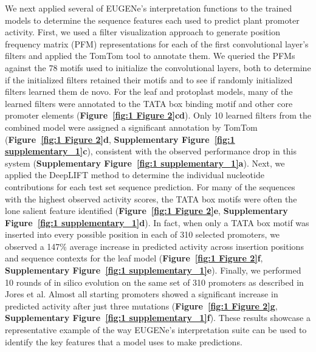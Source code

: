 We next applied several of EUGENe’s interpretation functions to the trained models to determine the sequence features each used to predict plant promoter activity. First, we used a filter visualization approach\cite{Minnoye2020-vz} to generate position frequency matrix (PFM) representations for each of the first convolutional layer’s filters and applied the TomTom\cite{Gupta2007-zw} tool to annotate them. We queried the PFMs against the 78 motifs used to initialize the convolutional layers, both to determine if the initialized filters retained their motifs and to see if randomly initialized filters learned them de novo. For the leaf and protoplast models, many of the learned filters were annotated to the TATA box binding motif and other core promoter elements (\textbf{Figure~\ref{fig:1 Figure 2}c}\textbf{d}). Only 10 learned filters from the combined model were assigned a significant annotation by TomTom (\textbf{Figure~\ref{fig:1 Figure 2}d}, \textbf{Supplementary Figure~\ref{fig:1 supplementary_1}c}), consistent with the observed performance drop in this system (\textbf{Supplementary Figure~\ref{fig:1 supplementary_1}a}). Next, we applied the DeepLIFT method\cite{Shrikumar2016-lf} to determine the individual nucleotide contributions for each test set sequence prediction. For many of the sequences with the highest observed activity scores, the TATA box motifs were often the lone salient feature identified (\textbf{Figure~\ref{fig:1 Figure 2}e}, \textbf{Supplementary Figure~\ref{fig:1 supplementary_1}d}). In fact, when only a TATA box motif was inserted into every possible position in each of 310 selected promoters, we observed a 147\% average increase in predicted activity across insertion positions and sequence contexts for the leaf model (\textbf{Figure~\ref{fig:1 Figure 2}f}, \textbf{Supplementary Figure~\ref{fig:1 supplementary_1}e}). Finally, we performed 10 rounds of in silico evolution on the same set of 310 promoters as described in Jores et al. Almost all starting promoters showed a significant increase in predicted activity after just three mutations (\textbf{Figure~\ref{fig:1 Figure 2}g}, \textbf{Supplementary Figure~\ref{fig:1 supplementary_1}f}). These results showcase a representative example of the way EUGENe’s interpretation suite can be used to identify the key features that a model uses to make predictions.

